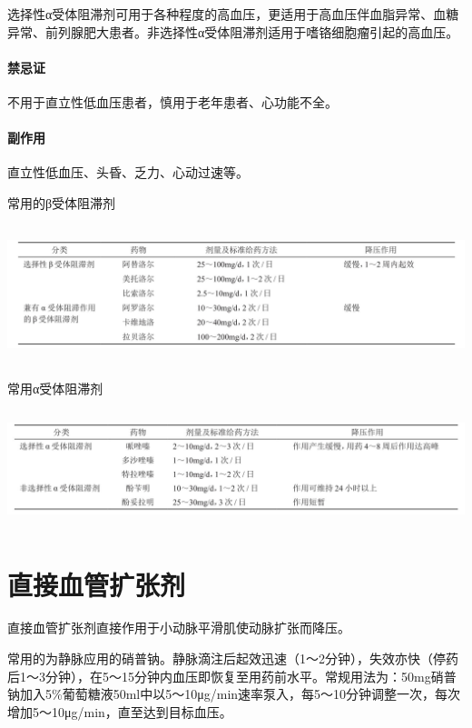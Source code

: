 选择性α受体阻滞剂可用于各种程度的高血压，更适用于高血压伴血脂异常、血糖异常、前列腺肥大患者。非选择性α受体阻滞剂适用于嗜铬细胞瘤引起的高血压。

\paragraph{禁忌证}

不用于直立性低血压患者，慎用于老年患者、心功能不全。

\paragraph{副作用}

直立性低血压、头昏、乏力、心动过速等。

\begin{table}[htbp]
\centering
\caption{常用的β受体阻滞剂}
\label{tab150-8}
\includegraphics[width=6.75in,height=1.58333in]{./images/Image00564.jpg}
\end{table}

\begin{table}[htbp]
\centering
\caption{常用α受体阻滞剂}
\label{tab150-9}
\includegraphics[width=6.65625in,height=1.33333in]{./images/Image00565.jpg}
\end{table}

\protect\hypertarget{text00416.html}{}{}

\section{直接血管扩张剂}

直接血管扩张剂直接作用于小动脉平滑肌使动脉扩张而降压。

常用的为静脉应用的硝普钠。静脉滴注后起效迅速（1～2分钟），失效亦快（停药后1～3分钟），在5～15分钟内血压即恢复至用药前水平。常规用法为：50mg硝普钠加入5\%葡萄糖液50ml中以5～10μg/min速率泵入，每5～10分钟调整一次，每次增加5～10μg/min，直至达到目标血压。

